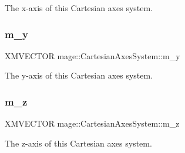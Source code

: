 The x-\/axis of this Cartesian axes system. \hypertarget{structmage_1_1_cartesian_axes_system_a2cc6bc4fe185791a877e1418e85d6b47}{}\label{structmage_1_1_cartesian_axes_system_a2cc6bc4fe185791a877e1418e85d6b47} 
\subsubsection{\texorpdfstring{m\+\_\+y}{m\_y}}
{\footnotesize\ttfamily X\+M\+V\+E\+C\+T\+OR mage\+::\+Cartesian\+Axes\+System\+::m\+\_\+y\hspace{0.3cm}{\ttfamily [private]}}

The y-\/axis of this Cartesian axes system. \hypertarget{structmage_1_1_cartesian_axes_system_abc733e5f82104391b0b352d263313d64}{}\label{structmage_1_1_cartesian_axes_system_abc733e5f82104391b0b352d263313d64} 
\subsubsection{\texorpdfstring{m\+\_\+z}{m\_z}}
{\footnotesize\ttfamily X\+M\+V\+E\+C\+T\+OR mage\+::\+Cartesian\+Axes\+System\+::m\+\_\+z\hspace{0.3cm}{\ttfamily [private]}}

The z-\/axis of this Cartesian axes system. 